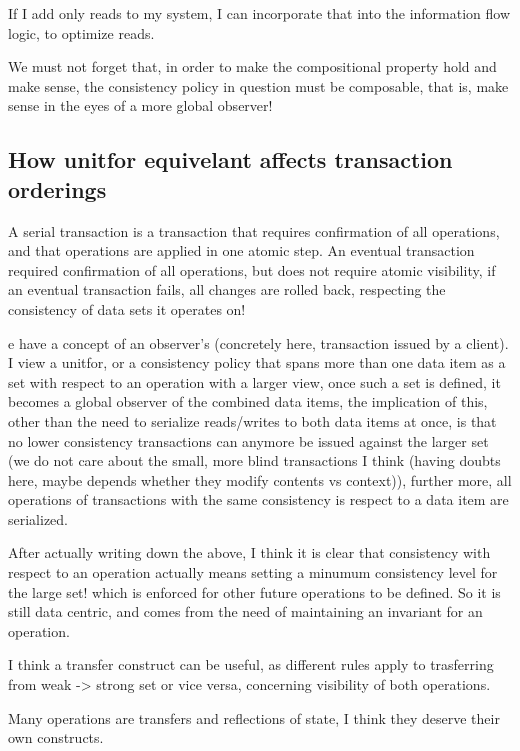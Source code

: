 If I add only reads to my system, I can incorporate that into the information flow logic,
to optimize reads. 

We must not forget that, in order to make the compositional property hold and
make sense, the consistency policy in question must be composable, that is, make
sense in the eyes of a more global observer!

\subsection{How unitfor equivelant affects transaction orderings}
A serial transaction is a transaction that requires confirmation of all
operations, and that operations are applied 
in one atomic step. An eventual transaction required confirmation of all
operations, but does not require atomic visibility, if an eventual transaction
fails, all changes are rolled back, respecting the consistency of data sets it
operates on! 

e have a concept of an observer's (concretely here, transaction issued by a
client). I view a unitfor, or a consistency policy that spans more than one data
item as a set with respect to an operation with a larger view, once such a set
is defined, it becomes a global observer of the combined data items, the
implication of this, other than the need to serialize reads/writes to both data
items at once, is that no lower consistency transactions can anymore be issued
against the larger set (we do not care about the small, more blind transactions
I think (having doubts here, maybe depends whether they modify contents vs
context)), further more, all operations of transactions with the same
consistency is respect to a data item are serialized. 

After actually writing down the above, I think it is clear that consistency with
respect to an operation actually means setting a minumum consistency level for
the large set! which is enforced for other future operations to be defined. So
it is still data centric, and comes from the need of maintaining an invariant
for an operation. 

I think a transfer construct can be useful, as different rules apply to
trasferring from weak -> strong set or vice versa, concerning visibility of both
operations. 

Many operations are transfers and reflections of state, I think they deserve
their own constructs. 
